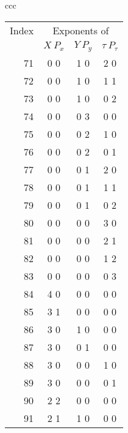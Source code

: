 {\begin{center}
\newpage
\begin{tabular}{ccc}
\begin{tabular}{rccc}
\multicolumn{1}{c}{Index} &
\multicolumn{3}{c}{Exponents of}\\
&$X\:P_x$&$Y\:P_y$&$\tau\:P_\tau$\\
71\hspace*{.125in}&0 0&1 0&2 0\\
72\hspace*{.125in}&0 0&1 0&1 1\\
73\hspace*{.125in}&0 0&1 0&0 2\\
74\hspace*{.125in}&0 0&0 3&0 0\\
75\hspace*{.125in}&0 0&0 2&1 0\\
76\hspace*{.125in}&0 0&0 2&0 1\\
77\hspace*{.125in}&0 0&0 1&2 0\\
78\hspace*{.125in}&0 0&0 1&1 1\\
79\hspace*{.125in}&0 0&0 1&0 2\\
80\hspace*{.125in}&0 0&0 0&3 0\\
81\hspace*{.125in}&0 0&0 0&2 1\\
82\hspace*{.125in}&0 0&0 0&1 2\\
83\hspace*{.125in}&0 0&0 0&0 3\\
84\hspace*{.125in}&4 0&0 0&0 0\\
85\hspace*{.125in}&3 1&0 0&0 0\\
86\hspace*{.125in}&3 0&1 0&0 0\\
87\hspace*{.125in}&3 0&0 1&0 0\\
88\hspace*{.125in}&3 0&0 0&1 0\\
89\hspace*{.125in}&3 0&0 0&0 1\\
90\hspace*{.125in}&2 2&0 0&0 0\\
91\hspace*{.125in}&2 1&1 0&0 0\\

\end{tabular}
\end{tabular}
\end{center}}
